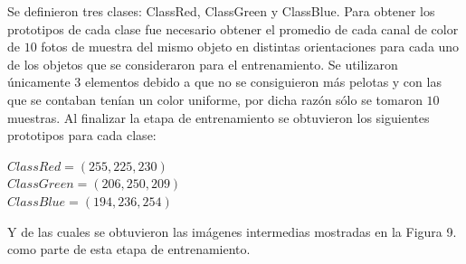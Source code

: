 \documentclass[conference]{IEEEtran}
\begin{document}
\newpage
Se definieron tres clases: ClassRed, ClassGreen y ClassBlue. Para obtener los prototipos de cada clase fue necesario obtener el promedio de cada canal de color de $10$ fotos de muestra del mismo objeto en distintas orientaciones para cada uno de los objetos que se consideraron para el entrenamiento. Se utilizaron \'unicamente 3 elementos debido a que no se consiguieron m\'as pelotas y con las que se contaban ten\'ian un color uniforme, por dicha raz\'on s\'olo se tomaron $10$ muestras. Al finalizar la etapa de entrenamiento se obtuvieron los siguientes prototipos para cada clase:\\

\begin{center}
$ClassRed = (255, 225, 230)$ \\
$ClassGreen = (206, 250, 209)$ \\
$ClassBlue = (194, 236, 254)$\\
\end{center}

Y de las cuales se obtuvieron las im\'agenes intermedias mostradas en la Figura 9. como parte de esta etapa de entrenamiento.
\end{document}
